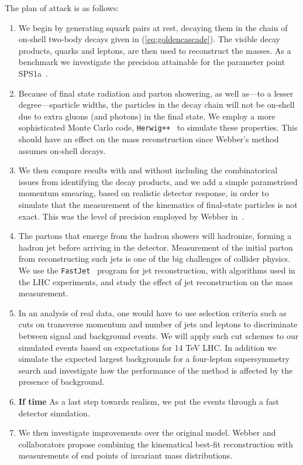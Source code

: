 \documentclass[twoside,english]{uiofysmaster}
\begin{document}
The plan of attack is as follows:
\begin{enumerate}
	\item We begin by generating squark pairs at rest, decaying them in the chain of on-shell two-body decays given in (\ref{eq:goldencascade}). The visible decay products, quarks and leptons, are then used to reconstruct the masses. As a benchmark we investigate the precision attainable for the parameter point SPS1a~\cite{Allanach:2002nj}. 
	\item Because of final state radiation and parton showering, as well as---to a lesser degree---sparticle widths, the particles in the decay chain will not be on-shell due to extra gluons (and photons) in the final state. We employ a more sophisticated Monte Carlo code, {\tt Herwig++}~\cite{Bahr:2008pv}  to simulate these properties. This should have an effect on the mass reconstruction since Webber's method assumes on-shell decays.
	\item	We then compare results with and without including the combinatorical issues from identifying the decay products, and we add a simple parametrised momentum smearing, based on realistic detector response, in order to simulate that the measurement of the kinematics of final-state particles is not exact. This was the level of precision employed by Webber in~\cite{Webber:2009vm}.
	\item The partons that emerge from the hadron showers will hadronize, forming a hadron jet before arriving in the detector. Measurement of the initial parton from reconstructing such jets is one of the big challenges of collider physics. We use the {\tt FastJet}~\cite{Cacciari:2011ma} program for jet reconstruction, with algorithms used in the LHC experiments, and study the effect of jet reconstruction on the mass measurement.
	\item In an analysis of real data, one would have to use selection criteria such as cuts on transverse momentum and number of jets and leptons to discriminate between signal and background events. We will apply such cut schemes to our simulated events based on expectations for 14 TeV LHC. In addition we simulate the expected largest backgrounds for a four-lepton supersymmetry search and investigate how the performance of the method is affected by the presence of background.
	\item {\bf If time} As a last step towards realism, we put the events through a fast detector simulation. 
	\item We then investigate improvements over the original model. Webber and collaborators \cite{Nojiri:2010dk} propose combining the kinematical best-fit reconstruction with measurements of end points of invariant mass distributions.

\end{enumerate}
\end{document}
